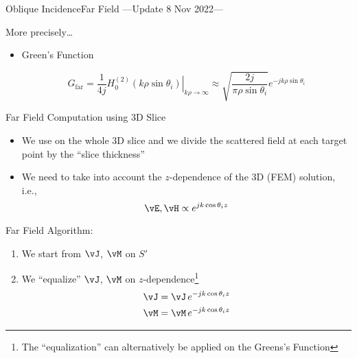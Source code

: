 \begin{frame}[allowframebreaks]{Oblique Incidence}{Far Field
    ---{Update 8 Nov 2022}---}
  \framebreak %
  
  \begin{block}{More precisely\ldots}
    \begin{itemize}
    \item Green's Function 

      \begin{equation*}
        G_\text{far} = \dfrac{1}{4j}
        \left.
          H_0^{(2)}\left( k\rho\sin\theta_i\right)
        \right|_{k\rho\rightarrow\infty} \approx
          \sqrt{\dfrac{2j}{\pi\rho\sin\theta_i}}
        e^{-j k \rho \sin\theta_i}
      \end{equation*}
      
    \end{itemize}

  \end{block}

  \framebreak %
  
  \begin{block}{Far Field Computation using 3D Slice}
    \begin{itemize}
    \item We use {\GreenD} on the whole 3D slice and we divide the
      scattered field at each target point by the ``slice thickness''
      
    \item We need to take into account the $z$-dependence of the
      3D (FEM) solution, i.e.,
      \begin{equation*}
        \vE,\vH \propto   e^{j k \cos\theta_i z}
      \end{equation*}
      
    \end{itemize}

  \end{block}
  
  \framebreak %
  
  \begin{block}{Far Field Algorithm:}
  \end{block}
  
    \begin{enumerate}
    \item We start from $\vJ$, $\vM$ on $S'$

    \item We ``equalize'' $\vJ$, $\vM$ on $z$-dependence\footnote{The
        ``equalization'' can alternatively be applied on the Greens's
        Function}
       \begin{align*}
         \vJ &= \vJ \, e^{-j k \cos\theta_i z} \\
         \vM &= \vM \, e^{-j k \cos\theta_i z} 
       \end{align*}


\end{enumerate}
\end{frame}
